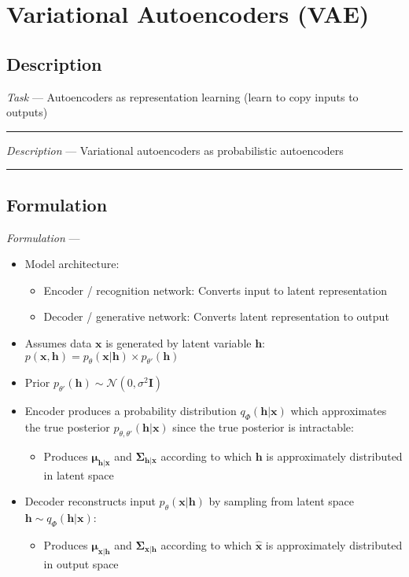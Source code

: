 \section{Variational Autoencoders (VAE)}
\subsection*{Description}
\emph{Task} --- Autoencoders as representation learning (learn to copy inputs to outputs)

{\color{lightgray}\hrule height 0.001mm}

\emph{Description} --- Variational autoencoders as probabilistic autoencoders

{\color{black}\hrule height 0.001mm}

\subsection*{Formulation}
\emph{Formulation} --- 
\begin{itemize}
    \item Model architecture: 
    \begin{itemize}
        \item Encoder / recognition network: Converts input to latent representation
        \item Decoder / generative network: Converts latent representation to output
    \end{itemize}
    \item Assumes data $\boldsymbol{x}$ is generated by latent variable $\boldsymbol{h}$: $p(\boldsymbol{x}, \boldsymbol{h}) = p_\theta(\boldsymbol{x} | \boldsymbol{h}) \times p_{\theta'}(\boldsymbol{h})$
    \item Prior $p_{\theta'}(\boldsymbol{h}) \sim \mathcal{N}(0,\sigma^2 \boldsymbol{I})$
    \item Encoder produces a probability distribution $q_\Phi(\boldsymbol{h}|\boldsymbol{x})$ which approximates the true posterior $p_{\theta, \theta'}(\boldsymbol{h}|\boldsymbol{x})$ since the true posterior is intractable:
    \begin{itemize}
        \item Produces $\boldsymbol{\mu}_{\boldsymbol{h|x}}$ and $\boldsymbol{\Sigma}_{\boldsymbol{h|x}}$ according to which $\boldsymbol{h}$ is approximately distributed in latent space
    \end{itemize}
    \item Decoder reconstructs input $p_\theta(\boldsymbol{x} | \boldsymbol{h})$ by sampling from latent space $\boldsymbol{h} \sim q_\Phi(\boldsymbol{h}|\boldsymbol{x})$:
    \begin{itemize}
        \item Produces $\boldsymbol{\mu}_{\boldsymbol{x|h}}$ and $\boldsymbol{\Sigma}_{\boldsymbol{x|h}}$ according to which $\boldsymbol{\hat{x}}$ is approximately distributed in output space
    \end{itemize}
\end{itemize}

